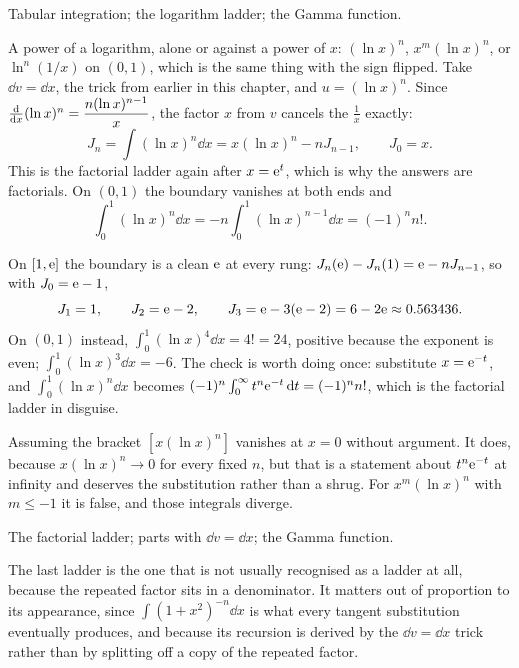 \begin{seealsob}Tabular integration; the logarithm ladder; the Gamma function.\end{seealsob}

\cue A power of a logarithm, alone or against a power of $x$: $(\ln x)^{n}$, $x^{m}(\ln x)^{n}$, or $\ln^{n}(1/x)$ on $(0,1)$, which is the same thing with the sign flipped.
\method Take $\dd v=\dd x$, the trick from earlier in this chapter, and $u=(\ln x)^{n}$. Since $\frac{\mathrm{d}}{\mathrm{d}x}(\ln x)^{n}=\dfrac{n(\ln x)^{n-1}}{x}$, the factor $x$ from $v$ cancels the $\tfrac1x$ exactly:
\[J_n=\int(\ln x)^{n}\dd x=x(\ln x)^{n}-nJ_{n-1},\qquad J_0=x.\]
This is the factorial ladder again after $x=\mathrm{e}^{t}$, which is why the answers are factorials. On $(0,1)$ the boundary vanishes at both ends and
\[\int_0^1(\ln x)^{n}\dd x=-n\int_0^1(\ln x)^{n-1}\dd x=(-1)^{n}n!.\]

\begin{worked}
On $[1,\mathrm{e}]$ the boundary is a clean $\mathrm{e}$ at every rung: $J_n(\mathrm{e})-J_n(1)=\mathrm{e}-nJ_{n-1}$, so with $J_0=\mathrm{e}-1$,
\[J_1=1,\qquad J_2=\mathrm{e}-2,\qquad J_3=\mathrm{e}-3(\mathrm{e}-2)=6-2\mathrm{e}\approx0.563436.\]
On $(0,1)$ instead, $\int_0^1(\ln x)^{4}\dd x=4!=24$, positive because the exponent is even; $\int_0^1(\ln x)^{3}\dd x=-6$. The check is worth doing once: substitute $x=\mathrm{e}^{-t}$, and $\int_0^1(\ln x)^{n}\dd x$ becomes $(-1)^{n}\int_0^{\infty}t^{n}\mathrm{e}^{-t}\,\mathrm{d} t=(-1)^{n}n!$, which is the factorial ladder in disguise.
\end{worked}

\begin{trap}
Assuming the bracket $[x(\ln x)^{n}]$ vanishes at $x=0$ without argument. It does, because $x(\ln x)^{n}\to0$ for every fixed $n$, but that is a statement about $t^{n}\mathrm{e}^{-t}$ at infinity and deserves the substitution rather than a shrug. For $x^{m}(\ln x)^{n}$ with $m\leq-1$ it is false, and those integrals diverge.
\end{trap}

\begin{seealsob}The factorial ladder; parts with $\dd v=\dd x$; the Gamma function.\end{seealsob}

The last ladder is the one that is not usually recognised as a ladder at all, because the repeated factor sits in a denominator. It matters out of proportion to its appearance, since $\int(1+x^{2})^{-n}\dd x$ is what every tangent substitution eventually produces, and because its recursion is derived by the $\dd v=\dd x$ trick rather than by splitting off a copy of the repeated factor.

